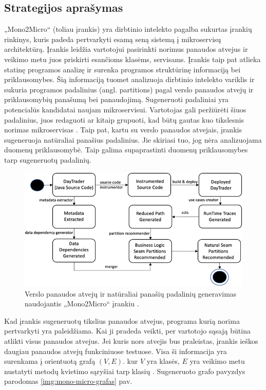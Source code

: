 \documentclass{VUMIFPSbakalaurinis}
\begin{document}
\subsection{Strategijos aprašymas}
„Mono2Micro“ (toliau įrankis) yra dirbtinio intelekto pagalba sukurtas įrankių rinkinys, kuris padeda pertvarkyti esamą seną sistemą į mikroservisų architektūrą. Įrankis leidžia vartotojui pasirinkti norimus panaudos atvejus ir veikimo metu juos priskirti esančioms klasėms, servisams. Įrankis taip pat atlieka statinę programos analizę ir surenka programos struktūrinę informaciją bei priklausomybes. Šią informaciją tuomet analizuoja dirbtinio intelekto variklis ir sukuria programos padalinius (angl. partitions) pagal verslo panaudos atvejų ir priklausomybių panašumą bei panaudojimą. Sugeneruoti padaliniai yra potencialūs kandidatai naujam mikroservisui. Vartotojas gali peržiūrėti šiuos padalinius, juos redaguoti ar kitaip grupuoti, kad būtų gautas kuo tikslesnis norimas mikroservisas \cite{KXK+21}. Taip pat, kartu su verslo panaudos atvejais, įrankis sugeneruoja natūraliai panašius padalinius. Jie skiriasi tuo, jog nėra analizuojama duomenų priklausomybė. Taip galima supaprastinti duomenų priklausomybes tarp sugeneruotų padalinių.

\begin{figure}[H]
    \centering
    \includegraphics{img/mono-2-micro-veikimas.png}
    \caption{Verslo panaudos atvejų ir natūraliai panašių padalinių generavimas naudojantis „Mono2Micro“ įrankiu \cite{KXL+20}.}
    \label{img:mono-2-micro}
\end{figure}

Kad įrankis sugeneruotų tikslius panaudos atvejus, programa kurią norima pertvarkyti yra paleidžiama. Kai ji pradeda veikti, per vartotojo sąsają būtina atlikti visus panaudos atvejus. Jei kuris nors atvejis bus praleistas, įrankis ieškos daugiau panaudos atvejų funkciniuose testuose. Visa ši informacija yra surenkama į orientuotą grafą $(V, E)$. kur $V$ yra klasės, $E$ yra veikimo metu nustatyti metodų kvietimo sąryšiai tarp klasių \cite{KXL+20}. Sugeneruoto grafo pavyzdys parodomas \ref{img:mono-micro-grafas} pav.
\end{document}
